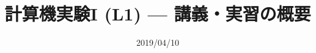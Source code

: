 \documentclass[dvipdfmx]{beamer}
\title{計算機実験I (L1) --- 講義・実習の概要}
\date{2019/04/10}
\begin{document}
\begin{frame}
  \titlepage
  \tableofcontents
\end{frame}






\end{document}
